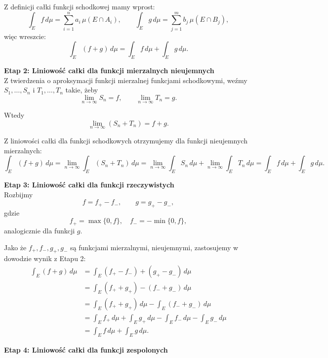 Z definicji całki funkcji schodkowej mamy wprost:
\[
	\int_E f \, d\mu = \sum_{i=1}^{n} a_i \, \mu(E \cap A_i), \qquad
	\int_E g \, d\mu = \sum_{j=1}^{m} b_j \, \mu(E \cap B_j),
\]
więc wreszcie:
\[
	\int_E (f+g)\, d\mu = \int_E f\, d\mu + \int_E g\, d\mu.
\]

\vspace{1em}

\textbf{Etap 2: Liniowość całki dla funkcji mierzalnych nieujemnych}
\\

Z twierdzenia o aproksymacji funkcji mierzalnej funkcjami schodkowymi, weźmy \(S_1, \dots, S_n\) i \(T_1, \dots, T_n\) takie, żeby
\[
	\lim_{n \to \infty} S_n = f, \qquad \lim_{n \to \infty} T_n = g.
\]

Wtedy
\[
	\lim_{n \to \infty} (S_n + T_n) = f+g.
\]

Z liniowości całki dla funkcji schodkowych otrzymujemy dla funkcji nieujemnych mierzalnych:
\[
	\int_E (f+g) \, d\mu = \lim_{n \to \infty} \int_E (S_n + T_n) \, d\mu
	= \lim_{n \to \infty} \int_E S_n \, d\mu + \lim_{n \to \infty} \int_E T_n \, d\mu
	= \int_E f \, d\mu + \int_E g \, d\mu.
\]

\vspace{1em}

\textbf{Etap 3: Liniowość całki dla funkcji rzeczywistych}
\\

Rozbijmy
\[
	f = f_+ - f_-, \qquad g = g_+ - g_-,
\]
gdzie
\[
	f_+ = \max\{0,f\}, \quad f_- = -\min\{0,f\},
\]
analogicznie dla funkcji \(g\).

Jako że \(f_+, f_-, g_+, g_-\) są funkcjami mierzalnymi, nieujemnymi, zastosujemy w dowodzie wynik z Etapu 2:
\[
	\begin{aligned}
		\int_E (f+g) \, d\mu
		 & = \int_E (f_+ - f_-) + (g_+ - g_-) \, d\mu                                          \\
		 & = \int_E (f_+ + g_+) - (f_- + g_-) \, d\mu                                          \\
		 & = \int_E (f_+ + g_+) \, d\mu - \int_E (f_- + g_-) \, d\mu                           \\
		 & = \int_E f_+ \, d\mu + \int_E g_+ \, d\mu - \int_E f_- \, d\mu - \int_E g_- \, d\mu \\
		 & = \int_E f \, d\mu + \int_E g \, d\mu.
	\end{aligned}
\]

\vspace{1em}

\textbf{Etap 4: Liniowość całki dla funkcji zespolonych}
\\

